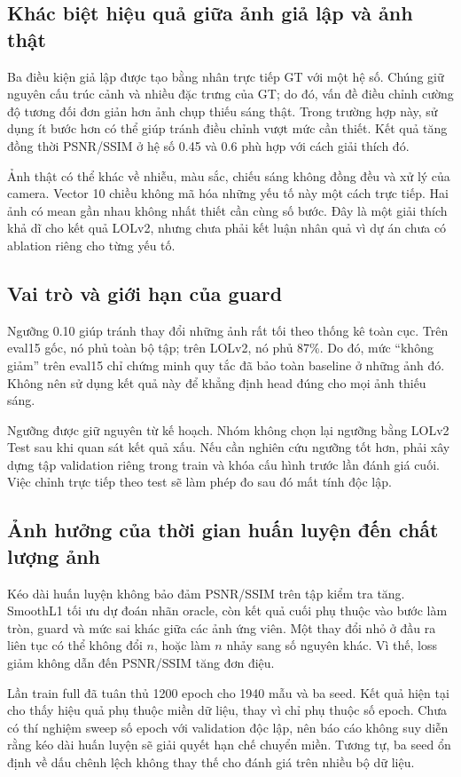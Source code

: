 \subsection{Khác biệt hiệu quả giữa ảnh giả lập và ảnh thật}
Ba điều kiện giả lập được tạo bằng nhân trực tiếp GT với một hệ số. Chúng giữ nguyên cấu trúc cảnh và nhiều đặc trưng của GT; do đó, vấn đề điều chỉnh cường độ tương đối đơn giản hơn ảnh chụp thiếu sáng thật. Trong trường hợp này, sử dụng ít bước hơn có thể giúp tránh điều chỉnh vượt mức cần thiết. Kết quả tăng đồng thời PSNR/SSIM ở hệ số 0.45 và 0.6 phù hợp với cách giải thích đó.

Ảnh thật có thể khác về nhiễu, màu sắc, chiếu sáng không đồng đều và xử lý của camera. Vector 10 chiều không mã hóa những yếu tố này một cách trực tiếp. Hai ảnh có mean gần nhau không nhất thiết cần cùng số bước. Đây là một giải thích khả dĩ cho kết quả LOLv2, nhưng chưa phải kết luận nhân quả vì dự án chưa có ablation riêng cho từng yếu tố.

\subsection{Vai trò và giới hạn của guard}\label{sec:guard}
Ngưỡng 0.10 giúp tránh thay đổi những ảnh rất tối theo thống kê toàn cục. Trên eval15 gốc, nó phủ toàn bộ tập; trên LOLv2, nó phủ 87\%. Do đó, mức ``không giảm'' trên eval15 chỉ chứng minh quy tắc đã bảo toàn baseline ở những ảnh đó. Không nên sử dụng kết quả này để khẳng định head đúng cho mọi ảnh thiếu sáng.

Ngưỡng được giữ nguyên từ kế hoạch. Nhóm không chọn lại ngưỡng bằng LOLv2 Test sau khi quan sát kết quả xấu. Nếu cần nghiên cứu ngưỡng tốt hơn, phải xây dựng tập validation riêng trong train và khóa cấu hình trước lần đánh giá cuối. Việc chỉnh trực tiếp theo test sẽ làm phép đo sau đó mất tính độc lập.

\subsection{Ảnh hưởng của thời gian huấn luyện đến chất lượng ảnh}
Kéo dài huấn luyện không bảo đảm PSNR/SSIM trên tập kiểm tra tăng. SmoothL1 tối ưu dự đoán nhãn oracle, còn kết quả cuối phụ thuộc vào bước làm tròn, guard và mức sai khác giữa các ảnh ứng viên. Một thay đổi nhỏ ở đầu ra liên tục có thể không đổi $n$, hoặc làm $n$ nhảy sang số nguyên khác. Vì thế, loss giảm không dẫn đến PSNR/SSIM tăng đơn điệu.

Lần train full đã tuân thủ 1200 epoch cho 1940 mẫu và ba seed. Kết quả hiện tại cho thấy hiệu quả phụ thuộc miền dữ liệu, thay vì chỉ phụ thuộc số epoch. Chưa có thí nghiệm sweep số epoch với validation độc lập, nên báo cáo không suy diễn rằng kéo dài huấn luyện sẽ giải quyết hạn chế chuyển miền. Tương tự, ba seed ổn định về dấu chênh lệch không thay thế cho đánh giá trên nhiều bộ dữ liệu.

